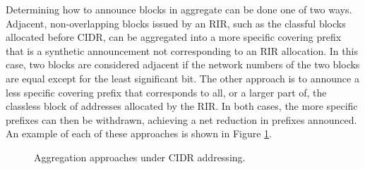 Determining how to announce blocks in aggregate can be done one of two ways.
Adjacent, non-overlapping blocks issued by an RIR, such as the classful blocks
allocated before CIDR, can be aggregated into a more specific covering prefix
that is a synthetic announcement not corresponding to an RIR allocation. In
this case, two blocks are considered adjacent if the network numbers of the two
blocks are equal except for the least significant bit. The other approach is to
announce a less specific covering prefix that corresponds to all, or a larger
part of, the classless block of addresses allocated by the RIR. In both cases,
the more specific prefixes can then be withdrawn, achieving a net reduction in
prefixes announced. An example of each of these approaches is shown in Figure
\ref{fig:cidr_agg}.

\begin{figure}
\begin{centering}
\caption{Aggregation approaches under CIDR addressing.}
\label{fig:cidr_agg}
\end{centering}
\end{figure}


